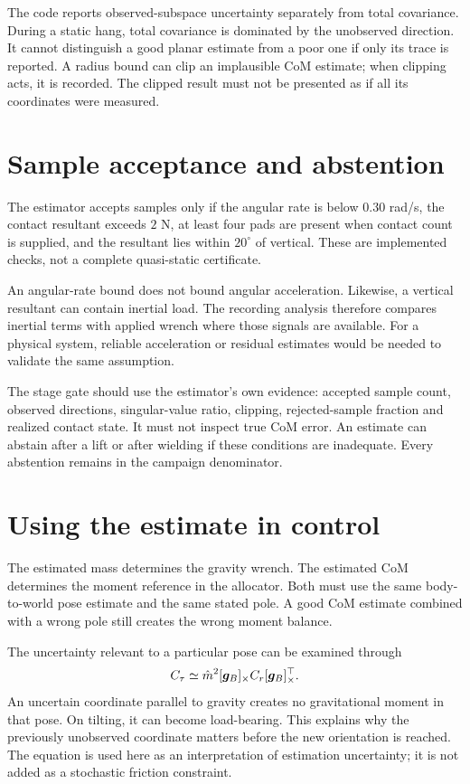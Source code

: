 The code reports observed-subspace uncertainty separately from total covariance. During a static hang, total covariance is dominated by the unobserved direction. It cannot distinguish a good planar estimate from a poor one if only its trace is reported. A radius bound can clip an implausible CoM estimate; when clipping acts, it is recorded. The clipped result must not be presented as if all its coordinates were measured.

\section{Sample acceptance and abstention}

The estimator accepts samples only if the angular rate is below $0.30$ rad/s, the contact resultant exceeds $2$ N, at least four pads are present when contact count is supplied, and the resultant lies within $20^\circ$ of vertical. These are implemented checks, not a complete quasi-static certificate.

An angular-rate bound does not bound angular acceleration. Likewise, a vertical resultant can contain inertial load. The recording analysis therefore compares inertial terms with applied wrench where those signals are available. For a physical system, reliable acceleration or residual estimates would be needed to validate the same assumption.

The stage gate should use the estimator's own evidence: accepted sample count, observed directions, singular-value ratio, clipping, rejected-sample fraction and realized contact state. It must not inspect true CoM error. An estimate can abstain after a lift or after wielding if these conditions are inadequate. Every abstention remains in the campaign denominator.

\section{Using the estimate in control}

The estimated mass determines the gravity wrench. The estimated CoM determines the moment reference in the allocator. Both must use the same body-to-world pose estimate and the same stated pole. A good CoM estimate combined with a wrong pole still creates the wrong moment balance.

The uncertainty relevant to a particular pose can be examined through
\begin{equation}
C_{\tau}\simeq \hat m^2[\bm{g}_B]_{\times}C_r[\bm{g}_B]_{\times}^\top.
\end{equation}
An uncertain coordinate parallel to gravity creates no gravitational moment in that pose. On tilting, it can become load-bearing. This explains why the previously unobserved coordinate matters before the new orientation is reached. The equation is used here as an interpretation of estimation uncertainty; it is not added as a stochastic friction constraint.

